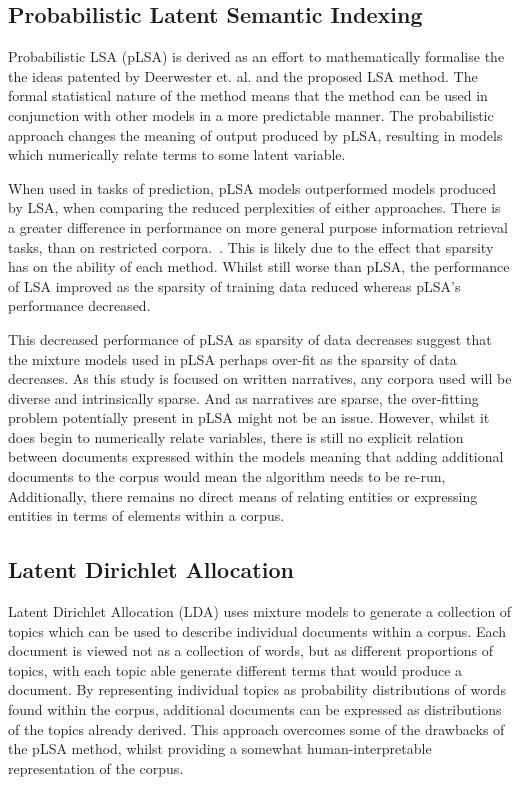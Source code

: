 \documentclass[10pt]{report}
\begin{document}
\subsection{Probabilistic Latent Semantic Indexing}
Probabilistic LSA (pLSA) is derived as an effort to mathematically formalise the the ideas patented by Deerwester et. al. and the proposed LSA method. The formal statistical nature of the method means that the method can be used in conjunction with other models in a more predictable manner. The probabilistic approach changes the meaning of output produced by pLSA, resulting in models which numerically relate terms to some latent variable. 

When used in tasks of prediction, pLSA models outperformed models produced by LSA, when comparing the reduced perplexities of either approaches. There is a greater difference in performance on more general purpose information retrieval tasks, than on restricted corpora.~\cite{Hofmann1999-qb}. This is likely due to the effect that sparsity has on the ability of each method. Whilst still worse than pLSA, the performance of LSA improved as the sparsity of training data reduced whereas pLSA’s performance decreased.

This decreased performance of pLSA as sparsity of data decreases suggest that the mixture models used in pLSA perhaps over-fit as the sparsity of data decreases. As this study is focused on written narratives, any corpora used will be diverse and intrinsically sparse. And as narratives are sparse, the over-fitting problem potentially present in pLSA might not be an issue. However, whilst it does begin to numerically relate variables, there is still no explicit relation between documents expressed within the models meaning that adding additional documents to the corpus would mean the algorithm needs to be re-run, Additionally, there remains no direct means of relating entities or expressing entities in terms of elements within a corpus.

\subsection{Latent Dirichlet Allocation}
Latent Dirichlet Allocation (LDA) uses mixture models to generate a collection of topics which can be used to describe individual documents within a corpus. Each document is viewed not as a collection of words, but as different proportions of topics, with each topic able generate different terms that would produce a document. By representing individual topics as probability distributions of words found within the corpus, additional documents can be expressed as distributions of the topics already derived. This approach overcomes some of the drawbacks of the pLSA method, whilst providing a somewhat human-interpretable representation of the corpus.~\cite{Blei2003-dj}
\end{document}

